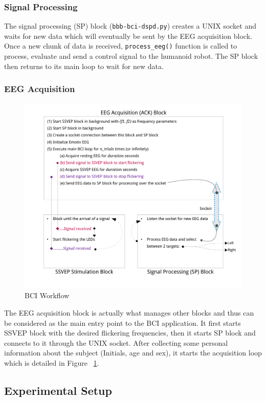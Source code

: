 \documentclass[12pt]{article}
\newcommand\mysubsection[1]{\subsection{#1}}
\newcommand\mysubsubsection[1]{\subsubsection{#1}}
\numberwithin{equation}{section}
\numberwithin{figure}{section}
\numberwithin{table}{section}
\begin{document}
\mysubsubsection{Signal Processing}
\par{
    The signal processing (SP) block (\texttt{bbb-bci-dspd.py}) creates a UNIX
    socket and waits for new data which will eventually be sent by the EEG acquisition block.
    Once a new chunk of data is received, \texttt{process\_eeg()}
    function is called to process, evaluate and send a control signal
    to the humanoid robot. The SP block then returns to its main loop
    to wait for new data.
}

\mysubsubsection{EEG Acquisition}
\par{
    \begin{figure}[ht]
        \centering
        \includegraphics[width=\textwidth]{images/workflow}
        \caption{BCI Workflow}
        \label{fig:workflow}
    \end{figure}
    The EEG acquisition block is actually what manages other blocks and thus
    can be considered as the main entry point to the BCI application. It first
    starts SSVEP block with the desired flickering frequencies, then it starts
    SP block and connects to it through the UNIX socket. After collecting
    some personal information about the subject (Initials, age and sex), it starts the acquisition
    loop which is detailed in Figure ~\ref{fig:workflow}.
}

\mysubsection{Experimental Setup}
\end{document}
